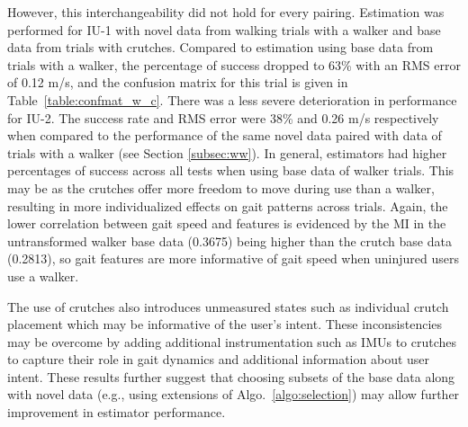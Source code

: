 However, this interchangeability did not hold for every pairing. Estimation was performed for IU-1 with novel data from walking trials with a walker and base data from trials with crutches. Compared to estimation using base data from trials with a walker, the percentage of success dropped to 63\% with an RMS error of 0.12 m/s, and the confusion matrix for this trial is given in Table~\ref{table:confmat_w_c}. There was a less severe deterioration in performance for IU-2. The success rate and RMS error were 38\% and 0.26 m/s respectively when compared to the performance of the same novel data paired with data of trials with a walker (see Section \ref{subsec:ww}). In general, estimators had higher percentages of success across all tests when using base data of walker trials. This may be as the crutches offer more freedom to move during use than a walker, resulting in more individualized effects on gait patterns across trials. Again, the lower correlation between gait speed and features is evidenced by the MI in the untransformed walker base data (0.3675) being higher than the  crutch base data (0.2813), so gait features are more informative of gait speed when uninjured users use a walker. 

The use of crutches also introduces unmeasured states such as individual crutch placement which may be informative of the user's intent. These inconsistencies may be overcome by adding additional instrumentation such as IMUs \cite{brescianini2011ins} to crutches to capture their role in gait dynamics and additional information about user intent. These results further suggest that choosing subsets of the base data along with novel data (e.g., using extensions of Algo.~\ref{algo:selection}) may allow further improvement in estimator performance.

